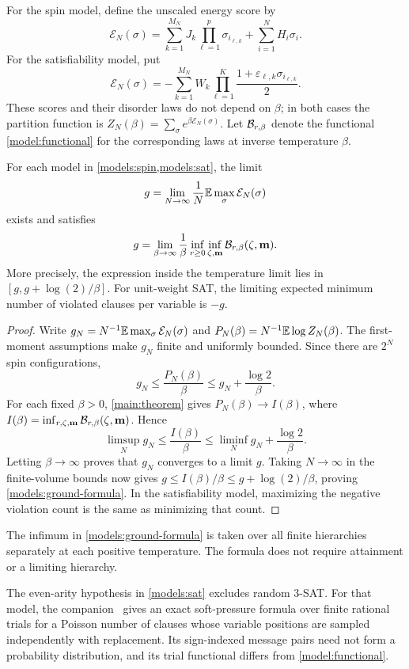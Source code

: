 For the spin model, define the unscaled energy score by
\[
 \mathcal E_N(\sigma)
 =\sum_{k=1}^{M_N}J_k\prod_{\ell=1}^p\sigma_{i_{\ell,k}}
   +\sum_{i=1}^N H_i\sigma_i.
\]
For the satisfiability model, put
\[
 \mathcal E_N(\sigma)
 =-\sum_{k=1}^{M_N}W_k
      \prod_{\ell=1}^K\frac{1+\varepsilon_{\ell,k}
       \sigma_{i_{\ell,k}}}{2}.
\]
These scores and their disorder laws do not depend on $\beta$; in
both cases the partition function is
$Z_N(\beta)=\sum_\sigma e^{\beta\mathcal E_N(\sigma)}$.
Let $\mathcal B_{r,\beta}$ denote the functional
\eqref{model:functional} for the corresponding laws at inverse
temperature $\beta$.

\begin{corollary}
\label{models:ground}
For each model in \cref{models:spin,models:sat}, the limit
\[
 g=\lim_{N\to\infty}\frac1N\mathbb E\max_\sigma\mathcal E_N(\sigma)
\]
exists and satisfies
\begin{equation}\label{models:ground-formula}
 g=\lim_{\beta\to\infty}\frac1\beta
       \inf_{r\ge0}\inf_{\zeta,\mathbf m}
          \mathcal B_{r,\beta}(\zeta,\mathbf m).
\end{equation}
More precisely, the expression inside the temperature limit lies in
$[g,g+\log(2)/\beta]$. For unit-weight SAT, the limiting expected
minimum number of violated clauses per variable is $-g$.
\end{corollary}

\begin{proof}
Write $g_N=N^{-1}\mathbb E\max_\sigma\mathcal E_N(\sigma)$ and
$P_N(\beta)=N^{-1}\mathbb E\log Z_N(\beta)$. The first-moment assumptions
make $g_N$ finite and uniformly bounded. Since there are $2^N$ spin
configurations,
\[
 g_N\le\frac{P_N(\beta)}\beta
       \le g_N+\frac{\log2}{\beta}.
\]
For each fixed $\beta>0$, \cref{main:theorem} gives
$P_N(\beta)\to I(\beta)$, where
$I(\beta)=\inf_{r,\zeta,\mathbf m}\mathcal B_{r,\beta}(\zeta,\mathbf m)$.
Hence
\[
 \limsup_N g_N\le\frac{I(\beta)}\beta
   \le\liminf_N g_N+\frac{\log2}{\beta}.
\]
Letting $\beta\to\infty$ proves that $g_N$ converges to a limit $g$.
Taking $N\to\infty$ in the finite-volume bounds now gives
$g\le I(\beta)/\beta\le g+\log(2)/\beta$, proving
\eqref{models:ground-formula}. In the satisfiability model, maximizing
the negative violation count is the same as minimizing that count.
\end{proof}

The infimum in \eqref{models:ground-formula} is taken over all finite
hierarchies separately at each positive temperature. The formula
does not require attainment or a limiting hierarchy.

\begin{remark}
The even-arity hypothesis in \cref{models:sat} excludes random 3-SAT.
For that model, the companion~\cite[Theorem~8.4]{OpenAIThreeSAT2026}
gives an exact soft-pressure formula over finite rational trials for a
Poisson number of clauses whose variable positions are sampled independently
with replacement. Its sign-indexed message pairs need not form a probability
distribution, and its trial functional differs from \eqref{model:functional}.
\end{remark}
